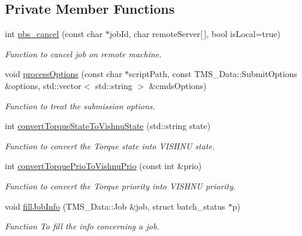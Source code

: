 \subsection*{Private Member Functions}
\begin{DoxyCompactItemize}
\item 
int \hyperlink{classTorqueServer_a8f155d04ceea433de756c98225c053b8}{pbs\_\-cancel} (const char $\ast$jobId, char remoteServer\mbox{[}$\,$\mbox{]}, bool isLocal=true)
\begin{DoxyCompactList}\small\item\em Function to cancel job on remote machine. \item\end{DoxyCompactList}\item 
void \hyperlink{classTorqueServer_a8c8357ec45741351b28891a01fd52a3b}{processOptions} (const char $\ast$scriptPath, const TMS\_\-Data::SubmitOptions \&options, std::vector$<$ std::string $>$ \&cmdsOptions)
\begin{DoxyCompactList}\small\item\em Function to treat the submission options. \item\end{DoxyCompactList}\item 
int \hyperlink{classTorqueServer_a5fb51c751187a2bd49598aee2b0e3b18}{convertTorqueStateToVishnuState} (std::string state)
\begin{DoxyCompactList}\small\item\em Function to convert the Torque state into VISHNU state. \item\end{DoxyCompactList}\item 
int \hyperlink{classTorqueServer_a2427d2d3c69cf28f779d22396383e4d4}{convertTorquePrioToVishnuPrio} (const int \&prio)
\begin{DoxyCompactList}\small\item\em Function to convert the Torque priority into VISHNU priority. \item\end{DoxyCompactList}\item 
void \hyperlink{classTorqueServer_a0411b4c5d842efabc66e9a5db39cceba}{fillJobInfo} (TMS\_\-Data::Job \&job, struct batch\_\-status $\ast$p)
\begin{DoxyCompactList}\small\item\em Function To fill the info concerning a job. \item\end{DoxyCompactList}\item 

\end{DoxyCompactItemize}
